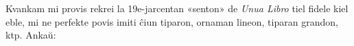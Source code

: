 \documentclass[12pt,twoside]{book}
\begin{document}
\sloppy

%
%


%
%



%
%




%
%


\sectionline

%
%


%
%


%
%


\sectionline

%
%


%
%
\kolofono

\small Kvankam mi provis rekrei la 19e-jarcentan «senton» de \emph{Unua Libro} tiel fidele kiel eble, mi ne perfekte povis imiti ĉiun tiparon, ornaman lineon, tiparan grandon, ktp.  Ankaŭ:
\end{document}
